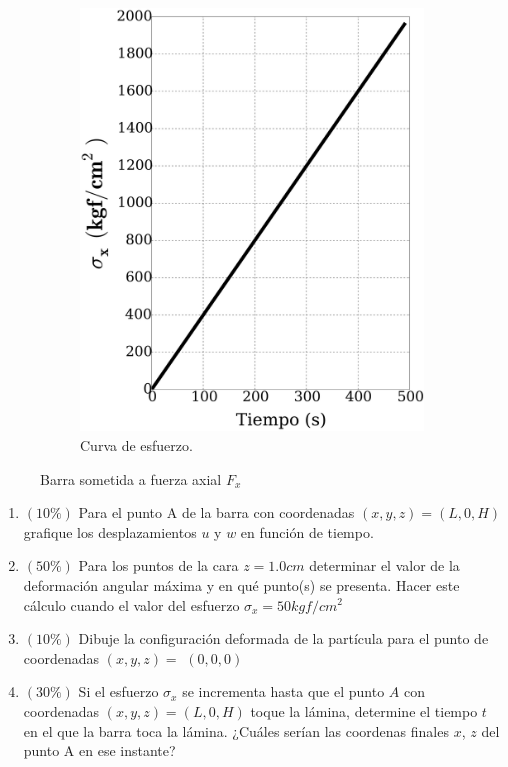\documentclass{exam}
\begin{document}
\begin{figure}[h]
\begin{subfigure}[r]{0.30\textwidth}
		\includegraphics[width=\textwidth]{images/CurvaEsf.pdf} 
		\caption{Curva de esfuerzo.}
		\label{sfig:esfuerzo}
	\end{subfigure}
	\caption{Barra sometida a fuerza axial $F_{x}$}
	\label{fig:barra}
\end{figure}

\begin{enumerate}
	\item $(10\%)$  Para el punto A de la barra con coordenadas  $(x,y,z) = (L, 0, H)$ grafique los desplazamientos $u$ y $w$ en función de tiempo. 
	\item $(50\%)$ Para los puntos de la cara $ z = 1.0 cm$ determinar el valor de la deformación angular máxima y en qué punto(s) se presenta. Hacer este cálculo cuando el valor del esfuerzo  $\sigma_x = 50  kgf/cm^2$  
	\item $(10\%)$  Dibuje la configuración deformada de la partícula para el punto de coordenadas $(x,y,z)=$ $(0,0,0)$ 

	\item $(30\%)$ Si el esfuerzo  $\sigma_x$ se incrementa  hasta que el punto  $A$ con coordenadas  $(x,y,z) = (L, 0, H)$ toque la lámina, determine el tiempo $t$  en el que la barra toca la lámina. ¿Cuáles serían las coordenas finales $x$, $z$ del punto A en ese instante? \\
	

\end{enumerate}
		
\end{document}
